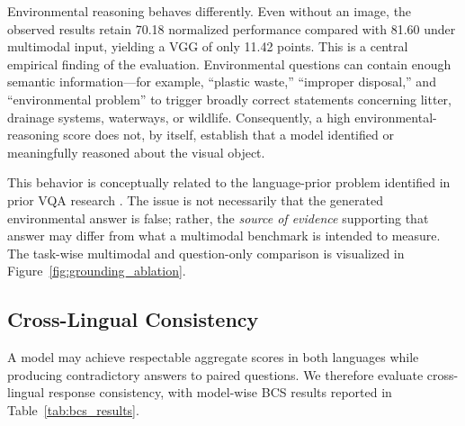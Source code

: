\documentclass{article}
\begin{document}
Environmental reasoning behaves differently. Even without an image, the observed results retain 70.18 normalized performance compared with 81.60 under multimodal input, yielding a VGG of only 11.42 points. This is a central empirical finding of the evaluation. Environmental questions can contain enough semantic information---for example, ``plastic waste,'' ``improper disposal,'' and ``environmental problem'' to trigger broadly correct statements concerning litter, drainage systems, waterways, or wildlife. Consequently, a high environmental-reasoning score does not, by itself, establish that a model identified or meaningfully reasoned about the visual object.

This behavior is conceptually related to the language-prior problem identified in prior VQA research \citep{goyal2017makingv}. The issue is not necessarily that the generated environmental answer is false; rather, the \emph{source of evidence} supporting that answer may differ from what a multimodal benchmark is intended to measure. The task-wise multimodal and question-only comparison is visualized in Figure~\ref{fig:grounding_ablation}.



\subsection{Cross-Lingual Consistency}
\label{subsec:bcs_results}
A model may achieve respectable aggregate scores in both languages while producing contradictory answers to paired questions. We therefore evaluate cross-lingual response consistency, with model-wise BCS results reported in Table~\ref{tab:bcs_results}.
\end{document}

